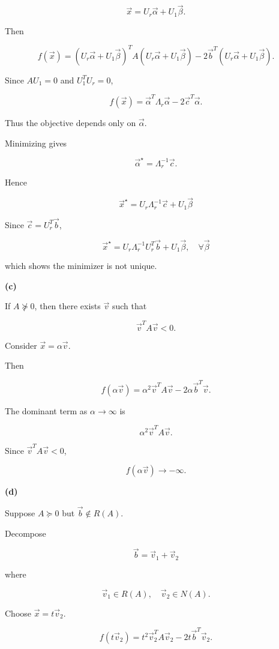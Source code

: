 \documentclass[
	12pt,
]{fphw}
\begin{document}
\[
\vec{x} = U_r \vec{\alpha} + U_1 \vec{\beta}.
\]

Then

\[
f(\vec{x})
= (U_r\vec{\alpha}+U_1\vec{\beta})^T
A
(U_r\vec{\alpha}+U_1\vec{\beta})
-2\vec{b}^T(U_r\vec{\alpha}+U_1\vec{\beta}).
\]

Since $AU_1=0$ and $U_1^T U_r=0$,

\[
f(\vec{x})
=
\vec{\alpha}^T \Lambda_r \vec{\alpha}
-2\vec{c}^T\vec{\alpha}.
\]

Thus the objective depends only on $\vec{\alpha}$.

Minimizing gives

\[
\vec{\alpha}^\star = \Lambda_r^{-1}\vec{c}.
\]

Hence

\[
\vec{x}^\star
=
U_r \Lambda_r^{-1} \vec{c}
+
U_1 \vec{\beta}
\]

Since $\vec{c}=U_r^T\vec{b}$,

\[
\vec{x}^\star = U_r \Lambda_r^{-1} U_r^T \vec{b} + U_1 \vec{\beta},\quad \forall \vec{\beta}
\]

which shows the minimizer is not unique.

\bigskip

\textbf{(c)}

If $A \not\succeq 0$, then there exists $\vec{v}$ such that

\[
\vec{v}^T A \vec{v} < 0.
\]

Consider $\vec{x}=\alpha \vec{v}$.

Then

\[
f(\alpha\vec{v})
=
\alpha^2 \vec{v}^T A \vec{v}
-2\alpha \vec{b}^T \vec{v}.
\]

The dominant term as $\alpha\to\infty$ is

\[
\alpha^2 \vec{v}^T A \vec{v}.
\]

Since $\vec{v}^T A \vec{v}<0$,

\[
f(\alpha\vec{v}) \to -\infty.
\]

\textbf{(d)}

Suppose $A\succeq0$ but $\vec{b}\notin R(A)$.

Decompose

\[
\vec{b} = \vec{v}_1 + \vec{v}_2
\]

where

\[
\vec{v}_1 \in R(A), \quad \vec{v}_2 \in N(A).
\]

Choose $\vec{x}=t\vec{v}_2$.


\[
f(t\vec{v}_2)
=
t^2 \vec{v}_2^T A \vec{v}_2
-
2t \vec{b}^T \vec{v}_2.
\]
\end{document}
